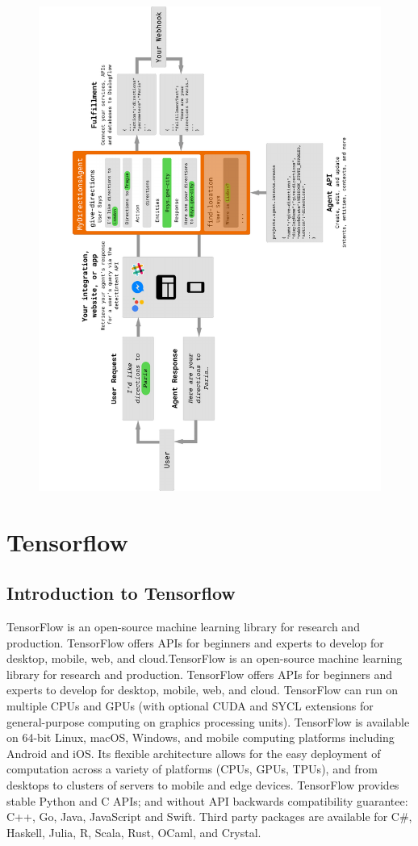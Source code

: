 \documentclass[14pt,a4paper]{article}
\begin{document}
\begin{figure}[h]
\centering
\includegraphics[angle=270,scale=.4]{dialogflowFlow.pdf}
\end{figure}
\newpage
\section{Tensorflow}
\subsection{Introduction to Tensorflow}
\par TensorFlow is an open-source machine learning library for research and production. TensorFlow offers APIs for beginners and experts to develop for desktop, mobile, web, and cloud.TensorFlow is an open-source machine learning library for research and production. TensorFlow offers APIs for beginners and experts to develop for desktop, mobile, web, and cloud.
TensorFlow can run on multiple CPUs and GPUs (with optional CUDA and SYCL extensions for general-purpose computing on graphics processing units). TensorFlow is available on 64-bit Linux, macOS, Windows, and mobile computing platforms including Android and iOS.
Its flexible architecture allows for the easy deployment of computation across a variety of platforms (CPUs, GPUs, TPUs), and from desktops to clusters of servers to mobile and edge devices.
TensorFlow provides stable Python and C APIs; and without API backwards compatibility guarantee: C++, Go, Java, JavaScript and Swift. Third party packages are available for C\#, Haskell, Julia, R, Scala, Rust, OCaml, and Crystal.
\end{document}

